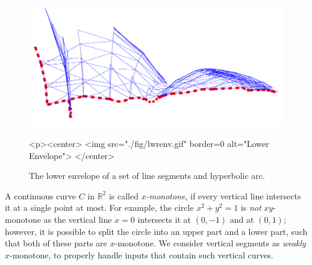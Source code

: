 \begin{figure}[!htp]
\begin{center}
\begin{ccTexOnly}
  \includegraphics[width=5in]{Envelope_2/fig/lwrenv}
\end{ccTexOnly}
\label{fig:teaser}
\begin{ccHtmlOnly}
  <p><center>
    <img src="./fig/lwrenv.gif" border=0 alt="Lower Envelope">
  </center>
\end{ccHtmlOnly}
\caption{The lower envelope of a set of line segments and hyperbolic
arc.} 
\end{center}
\end{figure}


A continuous curve $C$ in ${\mathbb R}^2$ is called {\em $x$-monotone}, if
every vertical line intersects it at a single point at most. For
example, the circle $x^2 + y^2 = 1$ is {\em not} $xy$-monotone as the
vertical line $x = 0$ intersects it at $(0, -1)$ and at $(0, 1)$;
however, it is possible to split the circle into an upper part and a
lower part, such that both of these parts are $x$-monotone.
We consider vertical segments as {\em weakly} $x$-monotone, to properly
handle inputs that contain such vertical curves.

